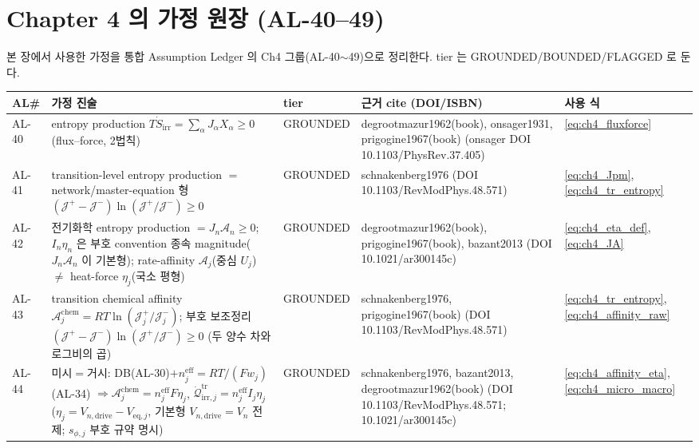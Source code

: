 \documentclass[11pt,a4paper]{article}
\newcommand{\eff}{\mathrm{eff}}
\newcommand{\eq}{\mathrm{eq}}
\newcommand{\drive}{\mathrm{drive}}
\newcommand{\irr}{\mathrm{irr}}
\newcommand{\tr}{\mathrm{tr}}
\newcommand{\chem}{\mathrm{chem}}
\newcommand{\brk}{\allowbreak}%
\begin{document}
\section{Chapter 4 의 가정 원장 (AL-40--49)}\label{sec:ch4_al}
본 장에서 사용한 가정을 통합 Assumption Ledger 의 Ch4 그룹(AL-40$\sim$49)으로 정리한다. tier 는
GROUNDED/BOUNDED/FLAGGED 로 둔다.
{\footnotesize
\setlength{\tabcolsep}{3pt}
\sloppy
\begin{longtable}{>{\raggedright\arraybackslash}p{} >{\raggedright\arraybackslash}p{} >{\raggedright\arraybackslash}p{} >{\raggedright\arraybackslash}p{} >{\raggedright\arraybackslash}p{}}
\toprule AL\# & 가정 진술 & tier & 근거 cite (DOI/ISBN) & 사용 식 \\ \midrule \endhead
AL-40 & entropy production $T\dot S_\irr=\sum_\alpha J_\alpha X_\alpha\ge0$ (flux--force, 2법칙) & GROUNDED & degrootmazur1962(book), onsager1931, prigogine1967(book) (onsager DOI 10.1103/\brk PhysRev.37.405) & \eqref{eq:ch4_fluxforce} \\
AL-41 & transition-level entropy production $=$ network/master-equation 형 $(\mathcal J^+{-}\mathcal J^-)\ln(\mathcal J^+/\mathcal J^-)\ge0$ & GROUNDED & schnakenberg1976 (DOI 10.1103/\brk RevModPhys.48.571) & \eqref{eq:ch4_Jpm},\allowbreak\eqref{eq:ch4_tr_entropy} \\
AL-42 & 전기화학 entropy production $=J_n\mathcal A_n\ge0$; $I_n\eta_n$ 은 부호 convention 종속 magnitude($J_n\mathcal A_n$ 이 기본형); rate-affinity $\mathcal A_j$(중심 $U_j$) $\ne$ heat-force $\eta_j$(국소 평형) & GROUNDED & degrootmazur1962(book), prigogine1967(book), bazant2013 (DOI 10.1021/\brk ar300145c) & \eqref{eq:ch4_eta_def},\allowbreak\eqref{eq:ch4_JA} \\
AL-43 & transition chemical affinity $\mathcal A_j^{\chem}=RT\ln(\mathcal J_j^+/\mathcal J_j^-)$; 부호 보조정리 $(\mathcal J^+{-}\mathcal J^-)\ln(\mathcal J^+/\mathcal J^-)\ge0$ (두 양수 차와 로그비의 곱) & GROUNDED & schnakenberg1976, prigogine1967(book) (DOI 10.1103/\brk RevModPhys.48.571) & \eqref{eq:ch4_tr_entropy},\allowbreak\eqref{eq:ch4_affinity_raw} \\
AL-44 & 미시$=$거시: DB(AL-30)$+n_j^\eff{=}RT/(Fw_j)$(AL-34) $\Rightarrow\mathcal A_j^{\chem}{=}n_j^\eff F\eta_j$, $\dot{\mathcal Q}_{\irr,j}^{\tr}{=}n_j^\eff I_j\eta_j$ ($\eta_j{=}V_{n,\drive}{-}V_{\eq,j}$, 기본형 $V_{n,\drive}{=}V_n$ 전제; $s_{\phi,j}$ 부호 규약 명시) & GROUNDED & schnakenberg1976, bazant2013, degrootmazur1962(book) (DOI 10.1103/\brk RevModPhys.48.571; 10.1021/\brk ar300145c) & \eqref{eq:ch4_affinity_eta},\allowbreak\eqref{eq:ch4_micro_macro} \\

\end{longtable}}
\end{document}
